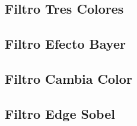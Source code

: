 \subsection{Filtro Tres Colores}


\subsection{Filtro Efecto Bayer}
%

\subsection{Filtro Cambia Color}
%

\subsection{Filtro Edge Sobel}
%


